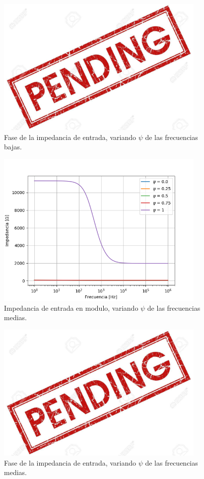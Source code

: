 \documentclass[a4paper]{article}
\begin{document}
\begin{figure}[H]
\centering
	\includegraphics[width=0.9\textwidth]{Imagenes/Zin-Low-Ph.png}
	\caption{Fase de la impedancia de entrada, variando $\psi$ de las frecuencias bajas.}
	\label{fig:bode_ph_low}
\end{figure}

\begin{figure}[H]
\centering
	\includegraphics[width=0.9\textwidth]{Imagenes/Zin-Med-Mod.png}
	\caption{Impedancia de entrada en modulo, variando $\psi$ de las frecuencias medias.}
	\label{fig:bode_modulo_low}
\end{figure}

\begin{figure}[H]
\centering
	\includegraphics[width=0.9\textwidth]{Imagenes/Zin-Med-Ph.png}
	\caption{Fase de la impedancia de entrada, variando $\psi$ de las frecuencias medias.}
	\label{fig:bode_ph_low}
\end{figure}
\end{document}
